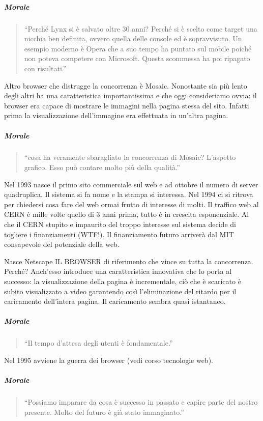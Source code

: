 		\subparagraph*{Morale}
		\begin{quote}
			``Perché Lynx si è salvato oltre 30 anni? Perché si è scelto come target una nicchia ben definita, ovvero quella delle console ed è sopravvisuto. Un esempio moderno è Opera che a suo tempo ha puntato sul mobile poiché non poteva competere con Microsoft. Questa scommessa ha poi ripagato con risultati.''
		\end{quote}
		
		Altro browser che distrugge la concorrenza è Mosaic. Nonostante sia più lento degli altri ha una caratteristica importantissima e che oggi consideriamo ovvia: il browser era capace di mostrare le immagini nella pagina stessa del sito. Infatti prima la visualizzazione dell'immagine era effettuata in un'altra pagina.
		
		\subparagraph*{Morale}
		\begin{quote}
			``cosa ha veramente sbaragliato la concorrenza di Mosaic? L’aspetto grafico. Esso può contare molto più della qualità.''
		\end{quote}
		
		Nel 1993 nasce il primo sito commerciale sul web e ad ottobre il numero di server quadruplica. Il sistema si fa nome e la stampa si interessa.
		Nel 1994 ci si ritrova per chiedersi cosa fare del web ormai frutto di interesse di molti. Il traffico web al CERN è mille volte quello di 3 anni prima, tutto è in crescita esponenziale. Al che il CERN stupito e impaurito del troppo interesse sul sistema decide di togliere i finanziamenti (WTF!). Il finanziamento futuro arriverà dal MIT consapevole del potenziale della web.
		
		Nasce Netscape IL BROWSER di riferimento che vince su tutta la concorrenza. Perché? Anch'esso introduce una caratteristica innovativa che lo porta al successo: la visualizzazione della pagina è incrementale, ciò che è scaricato è subito visualizzato a video garantendo così l'eliminazione del ritardo per il caricamento dell’intera pagina. Il caricamento sembra quasi istantaneo. 
		
		\subparagraph*{Morale}
		\begin{quote}
			``Il tempo d’attesa degli utenti è fondamentale.''
		\end{quote}
		
		Nel 1995 avviene la guerra dei browser (vedi corso tecnologie web).
		
		\subparagraph*{Morale}
		\begin{quote}
			``Possiamo imparare da cosa è successo in passato e capire parte del nostro presente. Molto del futuro è già stato immaginato.''
		\end{quote}

